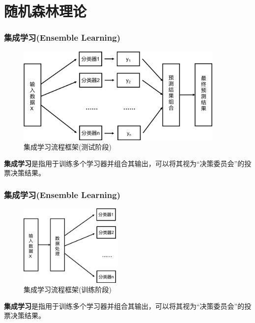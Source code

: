 \documentclass[10pt,aspectratio=43,mathserif]{beamer}
\begin{document}
\section[理论]{随机森林理论}

		\begin{frame}
		  \frametitle{\textbf{集成学习(Ensemble Learning)}}
            \begin{figure}[!t]
            \centering
            \includegraphics[width=4in]{figures/el.png}
            \caption{集成学习流程框架(测试阶段)}
            \end{figure}
            \textbf{集成学习}是指用于训练多个学习器并组合其输出，可以将其视为“决策委员会”的投票决策结果。
        \end{frame}
        
        \begin{frame}
            \frametitle{\textbf{集成学习(Ensemble Learning)}}
              \begin{figure}[!t]
              \centering
              \includegraphics[width=2in]{figures/el2.png}
              \caption{集成学习流程框架(训练阶段)}
              \end{figure}
              \textbf{集成学习}是指用于训练多个学习器并组合其输出，可以将其视为“决策委员会”的投票决策结果。
          \end{frame}
\end{document}
